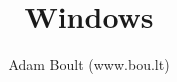 \documentclass[oneside]{book}
\begin{document}
\author{Adam Boult (www.bou.lt)}
\title{Windows}
\maketitle

\setcounter{tocdepth}{0}
\tableofcontents


\end{document}
